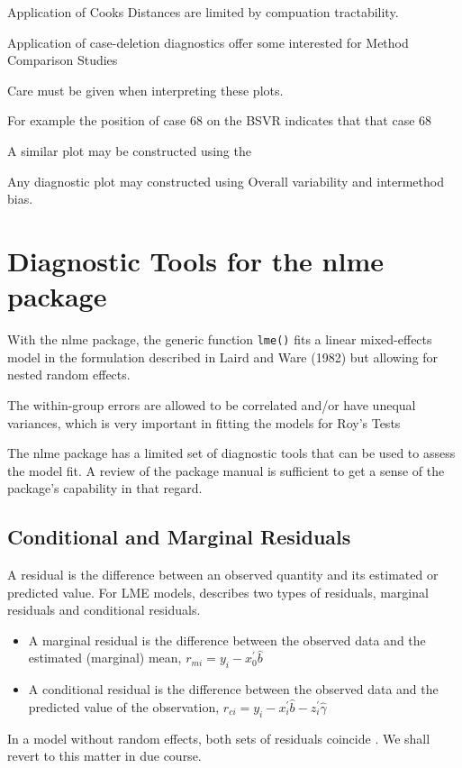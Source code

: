 Application of Cooks Distances are limited
by compuation tractability.


Application of case-deletion diagnostics
offer some interested for Method Comparison Studies


Care must be given when interpreting these plots. 

For example the position of case 68 on the BSVR indicates that that
case 68 

A similar plot may be constructed using the

Any diagnostic plot may constructed using Overall variability and intermethod bias.

\newpage
\section{Diagnostic Tools for the nlme package}


With the nlme package, the generic function \texttt{lme()} fits a linear mixed-effects model in the formulation described in Laird and Ware (1982) but allowing for nested random effects. 

The within-group errors are allowed to be correlated and/or have unequal variances, which is very important in fitting the models for Roy's Tests

The nlme package has a limited set of diagnostic tools that can be used to assess the model fit. A review of the package manual is sufficient to get a sense of the package's capability in that regard.


\newpage


\subsection{Conditional and Marginal Residuals}
A residual is the difference between an observed quantity and its estimated or predicted value. For LME models, \citet{schab} describes two types of residuals, marginal residuals and conditional residuals. 

\begin{itemize}
	\item A marginal residual is the difference between the observed data and the estimated (marginal) mean, $r_{mi} = y_i - x_0^{\prime} \hat{b}$
	\item A conditional residual is the difference between the observed data and the predicted value of the observation,
	$r_{ci} = y_i - x_i^{\prime} \hat{b} - z_i^{\prime} \hat{\gamma}$	
\end{itemize} 
In a model without random effects, both sets of
residuals coincide \citep{schab} . We shall revert to this matter in due course.



